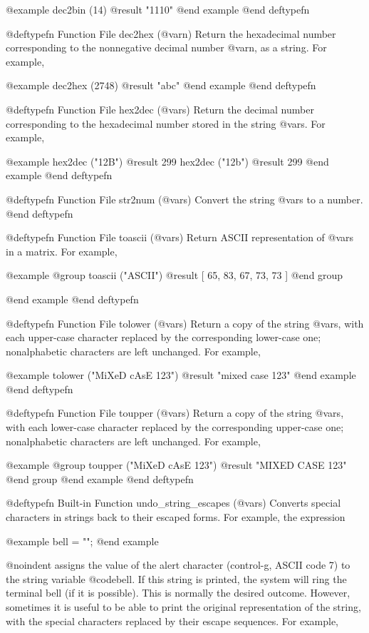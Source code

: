 {{{{@example
dec2bin (14)
     @result{} "1110"
@end example
@end deftypefn

@deftypefn {Function File} {} dec2hex (@var{n})
Return the hexadecimal number corresponding to the nonnegative decimal
number @var{n}, as a string.  For example,

@example
dec2hex (2748)
     @result{} "abc"
@end example
@end deftypefn

@deftypefn {Function File} {} hex2dec (@var{s})
Return the decimal number corresponding to the hexadecimal number stored
in the string @var{s}.  For example,

@example
hex2dec ("12B")
     @result{} 299
hex2dec ("12b")
     @result{} 299
@end example
@end deftypefn

@deftypefn {Function File} {} str2num (@var{s})
Convert the string @var{s} to a number.
@end deftypefn

@deftypefn {Function File} {} toascii (@var{s})
Return ASCII representation of @var{s} in a matrix.  For example,

@example
@group
toascii ("ASCII")
     @result{} [ 65, 83, 67, 73, 73 ]
@end group

@end example
@end deftypefn

@deftypefn {Function File} {} tolower (@var{s})
Return a copy of the string @var{s}, with each upper-case character
replaced by the corresponding lower-case one; nonalphabetic characters
are left unchanged.  For example,

@example
tolower ("MiXeD cAsE 123")
     @result{} "mixed case 123"
@end example
@end deftypefn

@deftypefn {Function File} {} toupper (@var{s})
Return a copy of the string @var{s}, with each  lower-case character
replaced by the corresponding upper-case one; nonalphabetic characters
are left unchanged.  For example,

@example
@group
toupper ("MiXeD cAsE 123")
     @result{} "MIXED CASE 123"
@end group
@end example
@end deftypefn

@deftypefn {Built-in Function} {} undo_string_escapes (@var{s})
Converts special characters in strings back to their escaped forms.  For
example, the expression

@example
bell = "\a";
@end example

@noindent
assigns the value of the alert character (control-g, ASCII code 7) to
the string variable @code{bell}.  If this string is printed, the
system will ring the terminal bell (if it is possible).  This is
normally the desired outcome.  However, sometimes it is useful to be
able to print the original representation of the string, with the
special characters replaced by their escape sequences.  For example,

}}}}
